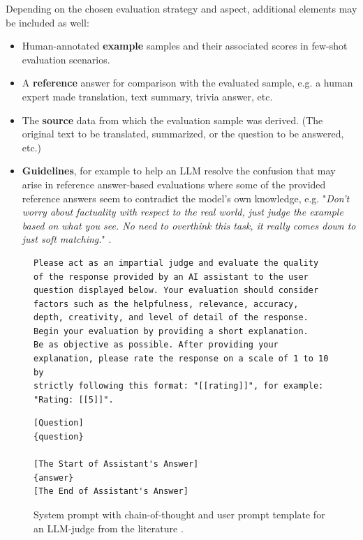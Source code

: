 \documentclass[UTF8,noindent,nohyp,parspace,titlepage,twoside,12pt]{article}
\begin{document}
        Depending on the chosen evaluation strategy and aspect, additional
        elements may be included as well:

        \begin{itemize}
          \item Human-annotated \textbf{example} samples and their associated
                scores in few-shot evaluation scenarios.

          \item A \textbf{reference} answer for comparison with the evaluated
                sample, e.g. a human expert made translation, text summary,
                trivia answer, etc.

          \item The \textbf{source} data from which the evaluation sample was
                derived. (The original text to be translated, summarized, or
                the question to be answered, etc.)

          \item \textbf{Guidelines}, for example to help an LLM resolve the
                confusion that may arise in reference answer-based evaluations
                where some of the provided reference answers seem to contradict
                the model's own knowledge, e.g. "\emph{Don't worry
                about factuality with respect to the real world, just judge the
                example based on what you see.  No need to overthink this task,
                it really comes down to just soft matching.}" \cite{juries}.
        \end{itemize}

        \begin{figure}[hbtp]
          \begin{lstlisting}[basicstyle=\tiny\sffamily,frame=single,linewidth=\textwidth]
Please act as an impartial judge and evaluate the quality of the response provided by an AI assistant to the user
question displayed below. Your evaluation should consider factors such as the helpfulness, relevance, accuracy,
depth, creativity, and level of detail of the response. Begin your evaluation by providing a short explanation.
Be as objective as possible. After providing your explanation, please rate the response on a scale of 1 to 10 by
strictly following this format: "[[rating]]", for example: "Rating: [[5]]".
          \end{lstlisting}
          \begin{lstlisting}[basicstyle=\tiny\sffamily,frame=single,linewidth=\textwidth]
[Question]
{question}

[The Start of Assistant's Answer]
{answer}
[The End of Assistant's Answer]
          \end{lstlisting}
          \caption{%
            System prompt with chain-of-thought and user prompt template for an
            LLM-judge from the literature \cite{arena}.
          }
          \label{figprompt}
        \end{figure}
\end{document}
